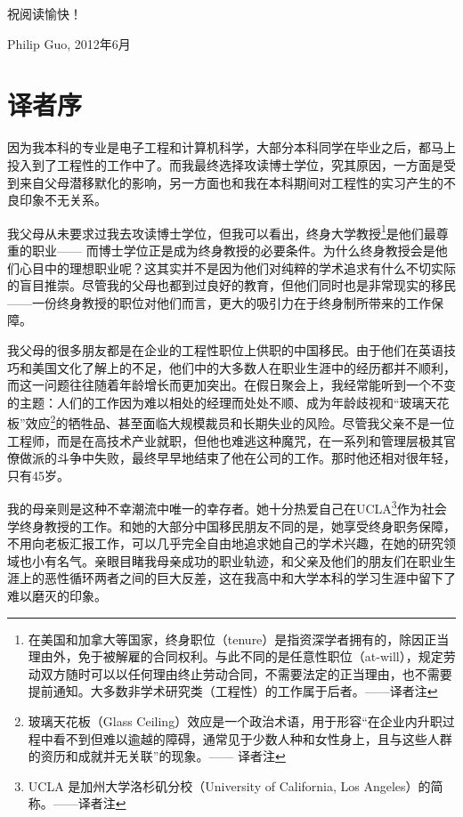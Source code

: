 \documentclass[letter,12pt]{book}
\begin{document}
\begin{CJK}{UTF8}{gbsn}
祝阅读愉快！

\begin{flushright}
Philip Guo, 2012年6月
\end{flushright}

\chapter*{译者序}
\markboth{}{}




\mainmatter



因为我本科的专业是电子工程和计算机科学，大部分本科同学在毕业之后，都马上投入到了工程性的工作中了。而我最终选择攻读博士学位，究其原因，一方面是受到来自父母潜移默化的影响，另一方面也和我在本科期间对工程性的实习产生的不良印象不无关系。

我父母从未要求过我去攻读博士学位，但我可以看出，终身大学教授\footnote{在美国和加拿大等国家，终身职位（tenure）是指资深学者拥有的，除因正当理由外，免于被解雇的合同权利。与此不同的是任意性职位（at-will），规定劳动双方随时可以以任何理由终止劳动合同，不需要法定的正当理由，也不需要提前通知。大多数非学术研究类（工程性）的工作属于后者。——译者注}是他们最尊重的职业—— 而博士学位正是成为终身教授的必要条件。为什么终身教授会是他们心目中的理想职业呢？这其实并不是因为他们对纯粹的学术追求有什么不切实际的盲目推崇。尽管我的父母也都到过良好的教育，但他们同时也是非常现实的移民——一份终身教授的职位对他们而言，更大的吸引力在于终身制所带来的工作保障。

我父母的很多朋友都是在企业的工程性职位上供职的中国移民。由于他们在英语技巧和美国文化了解上的不足，他们中的大多数人在职业生涯中的经历都并不顺利，而这一问题往往随着年龄增长而更加突出。在假日聚会上，我经常能听到一个不变的主题：人们的工作因为难以相处的经理而处处不顺、成为年龄歧视和“玻璃天花板”效应\footnote{玻璃天花板（Glass Ceiling）效应是一个政治术语，用于形容“在企业内升职过程中看不到但难以逾越的障碍，通常见于少数人种和女性身上，且与这些人群的资历和成就并无关联”的现象。—— 译者注}的牺牲品、甚至面临大规模裁员和长期失业的风险。尽管我父亲不是一位工程师，而是在高技术产业就职，但他也难逃这种魔咒，在一系列和管理层极其官僚做派的斗争中失败，最终早早地结束了他在公司的工作。那时他还相对很年轻，只有45岁。

我的母亲则是这种不幸潮流中唯一的幸存者。她十分热爱自己在UCLA\footnote{UCLA 是加州大学洛杉矶分校（University of California, Los Angeles）的简称。——译者注}作为社会学终身教授的工作。和她的大部分中国移民朋友不同的是，她享受终身职务保障，不用向老板汇报工作，可以几乎完全自由地追求她自己的学术兴趣，在她的研究领域也小有名气。亲眼目睹我母亲成功的职业轨迹，和父亲及他们的朋友们在职业生涯上的恶性循环两者之间的巨大反差，这在我高中和大学本科的学习生涯中留下了难以磨灭的印象。


\end{CJK}
\end{document}
